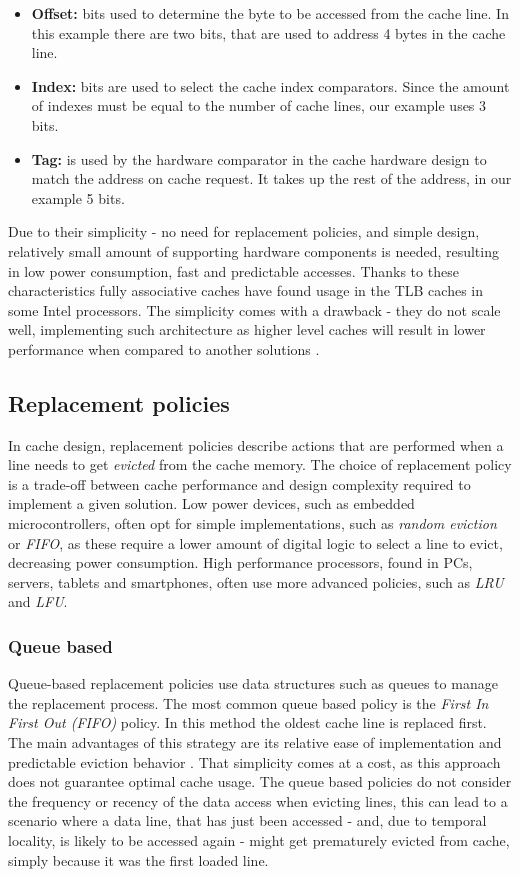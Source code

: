 \begin{itemize}
	\item \textbf{Offset:} bits used to determine the byte to be accessed from the cache line. In this example there are two bits, that are used to address 4 bytes in the cache line.
	\item \textbf{Index:}  bits are used to select the cache index comparators. Since the amount of indexes must be equal to the number of cache lines, our example uses 3 bits.
	\item \textbf{Tag:} is used by the hardware comparator in the cache hardware design to match the address on cache request. It takes up the rest of the address, in our example 5 bits.
\end{itemize}

\noindent Due to their simplicity - no need for replacement policies, and simple design, relatively small amount of supporting hardware components is needed, resulting in low power
consumption, fast and predictable accesses. Thanks to these characteristics fully associative caches have found usage in the TLB caches in some Intel processors. The simplicity
comes with a drawback - they do not scale well, implementing such architecture as higher level caches will result in lower performance when compared to another solutions \cite{whatevery}.

\subsection{Replacement policies} \label{sec:eviction_policies}
In cache design, replacement policies describe actions that are performed when a line needs to get \textit{evicted} from the cache memory.
The choice of replacement policy is a trade-off between cache performance and design complexity required to implement a given solution. Low power
devices, such as embedded microcontrollers, often opt for simple implementations, such as \textit{random eviction} or \textit{FIFO}, as these require
a lower amount of digital logic to select a line to evict, decreasing power consumption. High performance processors, found in PCs, servers, tablets and smartphones,
often use more advanced policies, such as \textit{LRU} and \textit{LFU}.

\subsubsection{Queue based}
Queue-based replacement policies use data structures such as queues to manage the replacement process. The most common queue based policy is the
\textit{First In First Out (FIFO)} policy. In this method the oldest cache line is replaced first. The main advantages of this strategy are
its relative ease of implementation and predictable eviction behavior \cite{fifo1}. That simplicity comes at a cost, as this approach does not guarantee optimal cache usage. The queue
based policies do not consider the frequency or recency of the data access when evicting lines, this can lead to a scenario where a data line, that has just been accessed - and, due to
temporal locality, is likely to be accessed again - might get prematurely evicted from cache, simply because it was the first loaded line.

